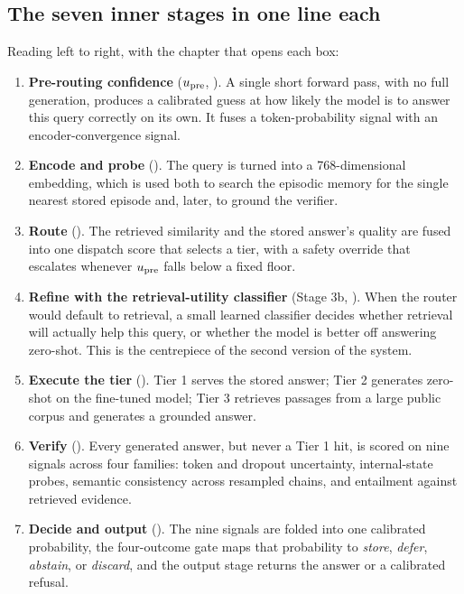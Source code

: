 \subsection*{The seven inner stages in one line each}

Reading  left to right, with the chapter that opens each
box:

\begin{enumerate}[leftmargin=1.8em]
  \item \textbf{Pre-routing confidence} ($u_{\text{pre}}$, ). A single short
  forward pass, with no full generation, produces a calibrated guess at how
  likely the model is to answer this query correctly on its own. It fuses a
  token-probability signal with an encoder-convergence signal.
  \item \textbf{Encode and probe} (). The query is turned into a
  768-dimensional embedding, which is used both to search the episodic memory for
  the single nearest stored episode and, later, to ground the verifier.
  \item \textbf{Route} (). The retrieved similarity and the
  stored answer's quality are fused into one dispatch score that selects a tier,
  with a safety override that escalates whenever $u_{\text{pre}}$ falls below a fixed
  floor.
  \item \textbf{Refine with the retrieval-utility classifier} (Stage 3b,
  ). When the router would default to retrieval, a small learned
  classifier decides whether retrieval will actually help this query, or whether
  the model is better off answering zero-shot. This is the centrepiece of the
  second version of the system.
  \item \textbf{Execute the tier} (). Tier 1 serves the stored
  answer; Tier 2 generates zero-shot on the fine-tuned model; Tier 3 retrieves
  passages from a large public corpus and generates a grounded answer.
  \item \textbf{Verify} (). Every generated answer, but never a
  Tier 1 hit, is scored on nine signals across four families: token and dropout
  uncertainty, internal-state probes, semantic consistency across resampled
  chains, and entailment against retrieved evidence.
  \item \textbf{Decide and output} (). The nine
  signals are folded into one calibrated probability, the four-outcome gate maps
  that probability to \emph{store}, \emph{defer}, \emph{abstain}, or
  \emph{discard}, and the output stage returns the answer or a calibrated
  refusal.
\end{enumerate}

